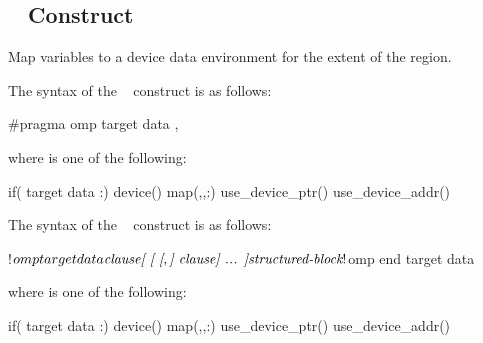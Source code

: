 \subsection{~ Construct}
\label{subsec:target data Construct}
\summary
Map variables to a device data environment for the extent of the region.

\syntax
\begin{ccppspecific}
The syntax of the ~ construct is as follows:

\begin{ompcPragma}
#pragma omp target data \plc{clause[ [ [},\plc{] clause] ... ] new-line}
\end{ompcPragma}

\begin{samepage}
where  is one of the following:

\begin{indentedcodelist}
if(\plc{[} target data :\plc{] scalar-expression})
device()
map(\plc{[[map-type-modifier[},\plc{] [map-type-modifier[},\plc{] ...] map-type}:\plc{ ] locator-list})
use_device_ptr()
use_device_addr()
\end{indentedcodelist}
\end{samepage}
\end{ccppspecific}
\medskip

\begin{fortranspecific}
The syntax of the ~ construct is as follows:

\begin{ompfPragma}
!$omp target data \plc{clause[ [ [},\plc{] clause] ... ]}
    \plc{structured-block}
!$omp end target data
\end{ompfPragma}

where  is one of the following:

\begin{indentedcodelist}
if(\plc{[} target data :\plc{] scalar-logical-expression})
device()
map(\plc{[[map-type-modifier[},\plc{] [map-type-modifier[},\plc{] ...] map-type}:\plc{ ] locator-list})
use_device_ptr()
use_device_addr()
\end{indentedcodelist}

\end{fortranspecific}

